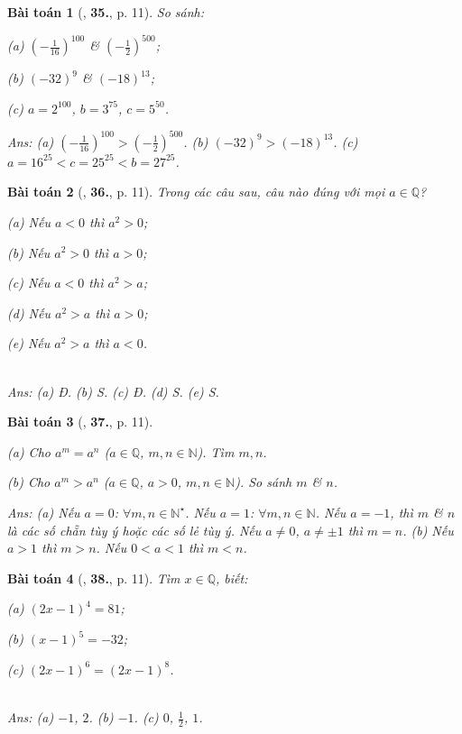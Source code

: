 \documentclass{article}
\numberwithin{equation}{section}
\newtheorem{baitoan}{Bài toán}
\begin{document}
\begin{baitoan}[\cite{Binh_Toan_7_tap_1}, \textbf{35.}, p. 11]
	So sánh:
	\begin{enumerate*}
		\item[(a)] $\left(-\frac{1}{16}\right)^{100}$ \& $\left(-\frac{1}{2}\right)^{500}$;
		\item[(b)] $(-32)^9$ \& $(-18)^{13}$;
		\item[(c)] $a = 2^{100}$, $b = 3^{75}$, $c = 5^{50}$.
	\end{enumerate*}\hfill\textsf{Ans:} (a) $\left(-\frac{1}{16}\right)^{100} > \left(-\frac{1}{2}\right)^{500}$. (b) $(-32)^9 > (-18)^{13}$. (c) $a = 16^{25} < c = 25^{25} < b = 27^{25}$.
\end{baitoan}

\begin{baitoan}[\cite{Binh_Toan_7_tap_1}, \textbf{36.}, p. 11]
	Trong các câu sau, câu nào đúng với mọi $a\in\mathbb{Q}$?
	\begin{enumerate*}
		\item[(a)] Nếu $a < 0$ thì $a^2 > 0$;
		\item[(b)] Nếu $a^2 > 0$ thì $a > 0$;
		\item[(c)] Nếu $a < 0$ thì $a^2 > a$;
		\item[(d)] Nếu $a^2 > a$ thì $a > 0$;
		\item[(e)] Nếu $a^2 > a$ thì $a < 0$.
	\end{enumerate*}\\\mbox{}\hfill\textsf{Ans:} (a) Đ. (b) S. (c) Đ. (d) S. (e) S.
\end{baitoan}

\begin{baitoan}[\cite{Binh_Toan_7_tap_1}, \textbf{37.}, p. 11]
	\begin{enumerate*}
		\item[(a)] Cho $a^m = a^n$ ($a\in\mathbb{Q}$, $m,n\in\mathbb{N}$). Tìm $m,n$.
		\item[(b)] Cho $a^m > a^n$ ($a\in\mathbb{Q}$, $a > 0$, $m,n\in\mathbb{N}$). So sánh $m$ \& $n$.
	\end{enumerate*}\hfill\textsf{Ans:} (a) Nếu $a = 0$: $\forall m,n\in\mathbb{N}^\star$. Nếu $a = 1$: $\forall m,n\in\mathbb{N}$. Nếu $a = -1$, thì $m$ \& $n$ là các số chẵn tùy ý hoặc các số lẻ tùy ý. Nếu $a\ne 0$, $a\ne\pm 1$ thì $m = n$. (b) Nếu $a > 1$ thì $m > n$. Nếu $0 < a < 1$ thì $m < n$.
\end{baitoan}

\begin{baitoan}[\cite{Binh_Toan_7_tap_1}, \textbf{38.}, p. 11]
	Tìm $x\in\mathbb{Q}$, biết:
	\begin{enumerate*}
		\item[(a)] $(2x - 1)^4 = 81$;
		\item[(b)] $(x - 1)^5 = -32$;
		\item[(c)] $(2x - 1)^6 = (2x - 1)^8$.
	\end{enumerate*}\\\mbox{}\hfill\textsf{Ans:} (a) $-1$, $2$. (b) $-1$. (c) $0$, $\frac{1}{2}$, $1$.
\end{baitoan}
\end{document}
